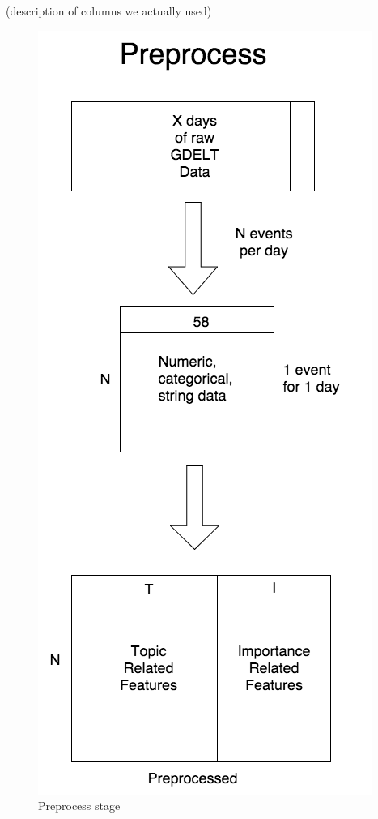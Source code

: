 
(description of columns we actually used)
\begin{figure}[ht]
\vskip 0.2in
\begin{center}
\centerline{\includegraphics[scale=0.15]{images/preprocess_vertical.png}}
\caption{Preprocess stage}
\end{center}
\vskip -0.2in
\label{fig:preprocess}
\end{figure} 


